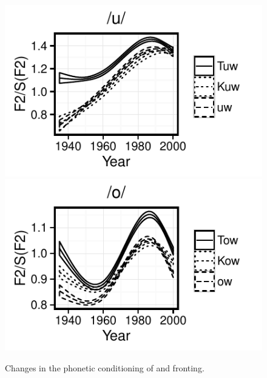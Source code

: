 \documentclass[12pt]{article}
\begin{document}
\vspace*{6pt}
\begin{figure}[H]
\includegraphics{uwphoneticconditioning}
\includegraphics{owphoneticconditioning}
\caption{Changes in the phonetic conditioning of  and  fronting.}
\end{figure}
\vspace*{6pt}
\end{document}
